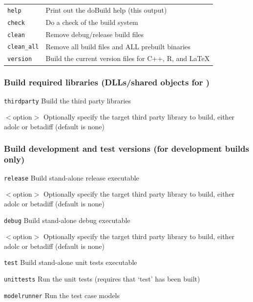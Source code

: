 \begin{tabular}{ll}
	\texttt{help} & Print out the doBuild help (this output) \\
	\texttt{check} & Do a check of the build system \\
	\texttt{clean} & Remove debug/release build files \\
	\texttt{clean\_all} & Remove all build files and ALL prebuilt binaries \\
	\texttt{version} & Build the current version files for C++, R, and \LaTeX \\
\end{tabular}

\subsubsection*{Build required libraries (DLLs/shared objects for \CNAME)}
\begin{description}
  \item{\texttt{thirdparty}} Build the third party libraries
  \begin{description}
    \item{$<$option$>$} Optionally specify the target third party library to build, either adolc or betadiff (default is none)
  \end{description}
\end{description}

\subsubsection*{Build development and test versions (for development builds only)}

\begin{description}
\item{\texttt{release}} Build stand-alone release executable
  \begin{description}
	\item{$<$option$>$} Optionally specify the target third party library to build, either adolc or betadiff (default is none)
  \end{description}
  \item{\texttt{debug}} Build stand-alone debug executable
  \begin{description}
	\item{$<$option$>$} Optionally specify the target third party library to build, either adolc or betadiff (default is none)
  \end{description}
  \item{\texttt{test}} Build stand-alone unit tests executable
  \item{\texttt{unittests}} Run the unit tests (requires that `test' has been built)
  \item{\texttt{modelrunner}} Run the test case models
\end{description}

